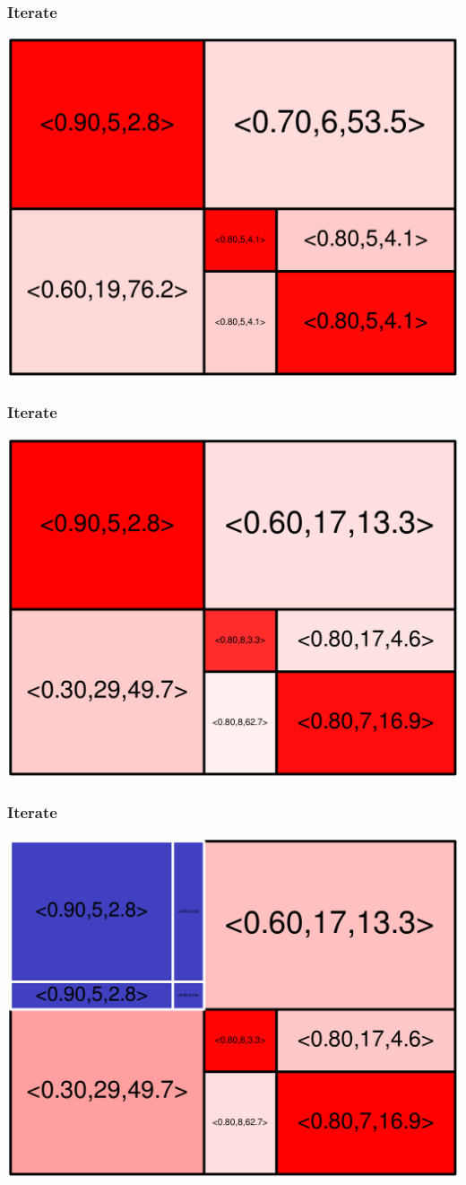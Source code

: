 \begin{frame}
\frametitle{Iterate}
\begin{centering}
\includegraphics[width=8.5 cm]{remy-graph/graph/test6.pdf}

\end{centering}
\end{frame}
\begin{frame}
\frametitle{Iterate}\begin{centering}\includegraphics[width=8.5 cm]{remy-graph/graph/test7.pdf}

\end{centering}\end{frame}


\begin{frame}
\frametitle{Iterate}\begin{centering}\includegraphics[width=8.5 cm]{remy-graph/graph/test8.pdf}

\end{centering}\end{frame}


